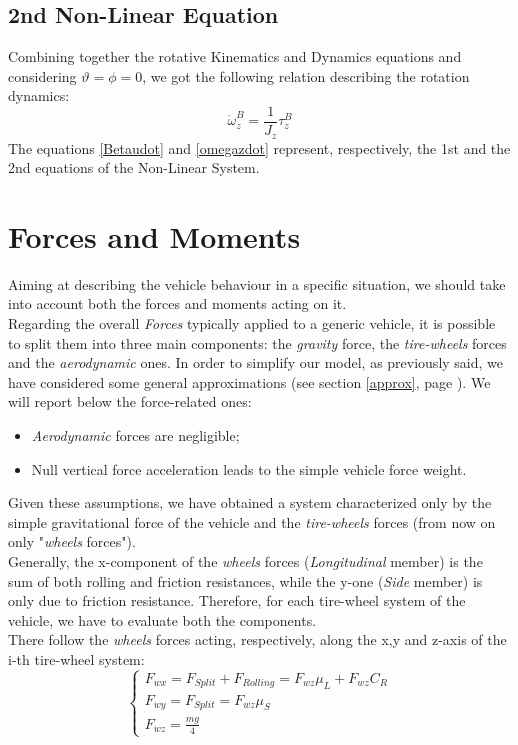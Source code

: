 \subsection{2nd Non-Linear Equation}
	Combining together the rotative Kinematics and Dynamics equations and considering $\vartheta = \phi = 0$, we got the following relation describing the rotation dynamics:
	\begin{equation} \label{omegazdot}
		\dot{\omega}_{z}^{B} = \frac{1}{J_{z}} \tau_{z}^{B}
	\end{equation}
	The equations \ref{Betaudot} and \ref{omegazdot} represent, respectively, the 1st and the 2nd equations of the Non-Linear System.
\section{Forces and Moments}
Aiming at describing the vehicle behaviour in a specific situation, we should take into account both the forces and moments acting on it. \\ Regarding the overall \textit{Forces} typically applied to a generic vehicle, it is possible to split them into three main components: the \textit{gravity} force, the \textit{tire-wheels} forces and the \textit{aerodynamic} ones. In order to simplify our model, as previously said, we have considered some general approximations (see section \ref{approx}, page \pageref{approx}). We will report below the force-related ones:
\begin{itemize}
	\item \textit{Aerodynamic} forces are negligible;
	\item Null vertical force acceleration leads to the simple vehicle force weight. 
\end{itemize}
Given these assumptions, we have obtained a system characterized only by the simple gravitational force of the vehicle and the \textit{tire-wheels} forces (from now on only "\textit{wheels} forces"). \\ Generally, the x-component of the \textit{wheels} forces (\textit{Longitudinal} member) is the sum of both rolling and friction resistances, while the y-one (\textit{Side} member) is only due to friction resistance. 
Therefore, for each tire-wheel system of the vehicle, we have to evaluate both the components. \\
There follow the \textit{wheels} forces acting, respectively, along the x,y and z-axis of the i-th tire-wheel system:
\begin{equation} \label{split e roll}
\begin{cases}
F_{wx} = F_{Split} + F_{Rolling} = F_{wz} \mu_{L} + F_{wz} C_{R} \\
F_{wy} = F_{Split} = F_{wz} \mu_{S} \\
F_{wz} = \frac{mg}{4}
\end{cases}
\end{equation}

